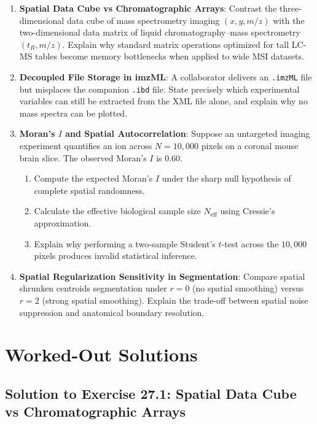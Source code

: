 \documentclass[11pt,twoside,openright]{book}
\begin{document}
\begin{enumerate}
    \item \textbf{Spatial Data Cube vs Chromatographic Arrays}: Contrast the three-dimensional data cube of mass spectrometry imaging $(x, y, m/z)$ with the two-dimensional data matrix of liquid chromatography--mass spectrometry $(t_R, m/z)$. Explain why standard matrix operations optimized for tall LC-MS tables become memory bottlenecks when applied to wide MSI datasets.
    \item \textbf{Decoupled File Storage in imzML}: A collaborator delivers an \texttt{.imzML} file but misplaces the companion \texttt{.ibd} file. State precisely which experimental variables can still be extracted from the XML file alone, and explain why no mass spectra can be plotted.
    \item \textbf{Moran's $I$ and Spatial Autocorrelation}: Suppose an untargeted imaging experiment quantifies an ion across $N = 10{,}000$ pixels on a coronal mouse brain slice. The observed Moran's $I$ is $0.60$.
    \begin{enumerate}
        \item Compute the expected Moran's $I$ under the sharp null hypothesis of complete spatial randomness.
        \item Calculate the effective biological sample size $N_{\text{eff}}$ using Cressie's approximation.
        \item Explain why performing a two-sample Student's $t$-test across the $10{,}000$ pixels produces invalid statistical inference.
    \end{enumerate}
    \item \textbf{Spatial Regularization Sensitivity in Segmentation}: Compare spatial shrunken centroids segmentation under $r = 0$ (no spatial smoothing) versus $r = 2$ (strong spatial smoothing). Explain the trade-off between spatial noise suppression and anatomical boundary resolution.
\end{enumerate}

\section{Worked-Out Solutions}

\subsection{Solution to Exercise 27.1: Spatial Data Cube vs Chromatographic Arrays}
\end{document}
